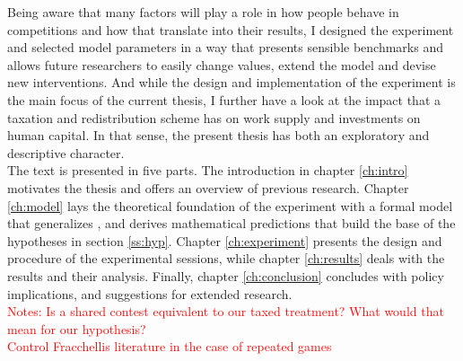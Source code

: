 Being aware that many factors will play a role in how people behave in competitions and how that translate into their results, I designed the experiment and selected model parameters in a way that presents sensible benchmarks and allows future researchers to easily change values, extend the model and devise new interventions. And while the design and implementation of the experiment is the main focus of the current thesis, I further have a look at the impact that a taxation and redistribution scheme has on work supply and investments on human capital. In that sense, the present thesis has both an exploratory and descriptive character.\\ 

The text is presented in five parts. The introduction in chapter \ref{ch:intro} motivates the thesis and offers an overview of previous research. Chapter \ref{ch:model} lays the theoretical foundation of the experiment with a formal model that generalizes \cite{koch2017}, and derives mathematical predictions that build the base of the hypotheses in section \ref{ss:hyp}. Chapter \ref{ch:experiment} presents the design and procedure of the experimental sessions, while chapter \ref{ch:results} deals with the results and their analysis. Finally, chapter \ref{ch:conclusion} concludes with policy implications, and suggestions for extended research.\\

\textcolor{red}{Notes: Is a shared contest equivalent to our taxed treatment? What would that mean for our hypothesis?\\Control Fracchellis literature in the case of repeated games}
